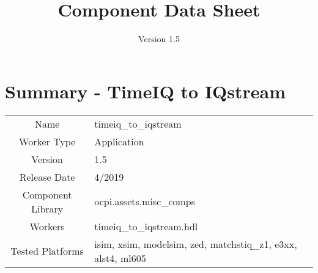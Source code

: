 \iffalse
This file is protected by Copyright. Please refer to the COPYRIGHT file
distributed with this source distribution.

This file is part of OpenCPI <http://www.opencpi.org>

OpenCPI is free software: you can redistribute it and/or modify it under the
terms of the GNU Lesser General Public License as published by the Free Software
Foundation, either version 3 of the License, or (at your option) any later
version.

OpenCPI is distributed in the hope that it will be useful, but WITHOUT ANY
WARRANTY; without even the implied warranty of MERCHANTABILITY or FITNESS FOR A
PARTICULAR PURPOSE. See the GNU Lesser General Public License for more details.

You should have received a copy of the GNU Lesser General Public License along
with this program. If not, see <http://www.gnu.org/licenses/>.
\fi

\def\docTitle{Component Data Sheet}
\def\docVersion{1.5}
\def\snippetpath{../../../../../../doc/av/tex/snippets}


\date{Version \docVersion} %
\title{\docTitle}
\lhead{\small{\docTitle}}

\usepackage{longtable} %

\def\comp{timeiq\_to\_iqstream}
\def\ecomp{timeiq_to_iqstream}
\def\Comp{TimeIQ to IQstream}
\graphicspath{ {figures/} }



\section*{Summary - \Comp}
\begin{tabular}{|c|M{13.5cm}|}
	\hline
	                  &                        							\\
	\hline
	Name              & \comp                  							\\
	\hline
	Worker Type       & Application            							\\
	\hline
	Version           & \docVersion                  							\\
	\hline
	Release Date      & 4/2019           						\\
	\hline
	Component Library & ocpi.assets.misc\_comps					\\
	\hline
	Workers           & \comp.hdl              							\\
	\hline
	Tested Platforms  & isim, xsim, modelsim, zed, matchstiq\_z1, e3xx, alst4, ml605	\\
	\hline
\end{tabular}


